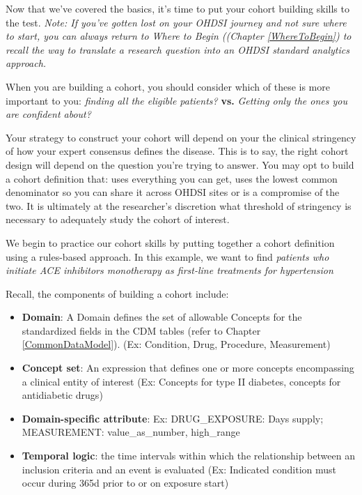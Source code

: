 \documentclass[11pt]{book}
\providecommand{\tightlist}{%
  \setlength{\itemsep}{0pt}\setlength{\parskip}{0pt}}
\theoremstyle{definition}
\theoremstyle{definition}
\theoremstyle{definition}
\theoremstyle{remark}
\begin{document}
Now that we've covered the basics, it's time to put your cohort building skills to the test. \emph{Note: If you've gotten lost on your OHDSI journey and not sure where to start, you can always return to Where to Begin ((Chapter \ref{WhereToBegin}) to recall the way to translate a research question into an OHDSI standard analytics approach.}

When you are building a cohort, you should consider which of these is more important to you: \emph{finding all the eligible patients?} \textbf{vs.} \emph{Getting only the ones you are confident about?}

Your strategy to construct your cohort will depend on your the clinical stringency of how your expert consensus defines the disease. This is to say, the right cohort design will depend on the question you're trying to answer. You may opt to build a cohort definition that: uses everything you can get, uses the lowest common denominator so you can share it across OHDSI sites or is a compromise of the two. It is ultimately at the researcher's discretion what threshold of stringency is necessary to adequately study the cohort of interest.

We begin to practice our cohort skills by putting together a cohort definition using a rules-based approach. In this example, we want to find \emph{patients who initiate ACE inhibitors monotherapy as first-line treatments for hypertension}

Recall, the components of building a cohort include:

\begin{itemize}
\tightlist
\item
  \textbf{Domain}: A Domain defines the set of allowable Concepts for the standardized fields in the CDM tables (refer to Chapter \ref{CommonDataModel}). (Ex: Condition, Drug, Procedure, Measurement)
\item
  \textbf{Concept set}: An expression that defines one or more concepts encompassing a clinical entity of interest (Ex: Concepts for type II diabetes, concepts for antidiabetic drugs)
\item
  \textbf{Domain-specific attribute}: Ex: DRUG\_EXPOSURE: Days supply; MEASUREMENT: value\_as\_number, high\_range
\item
  \textbf{Temporal logic}: the time intervals within which the relationship between an inclusion criteria and an event is evaluated (Ex: Indicated condition must occur during 365d prior to or on exposure start)
\end{itemize}
\end{document}
